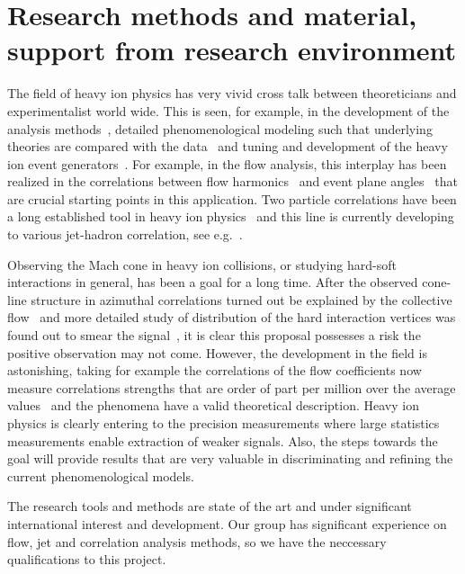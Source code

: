 \section{Research methods and material, support from research environment} %
\label{sec:researchmethods}

The field of heavy ion physics has very vivid cross talk between theoreticians and experimentalist world wide. This is seen, for example, in the development of the analysis methods~\cite{Poskanzer:1998yz,Bilandzic:2010jr}, detailed phenomenological modeling such that underlying theories are compared with the data~\cite{Burke:2013yra,Renk:2011gj,Niemi:2015qia} and tuning and development of the heavy ion event generators~\cite{Gyulassy:1994ew,Lin:2004en,Lokhtin2006}. For example, in the flow analysis, this interplay has been realized in the correlations between flow harmonics~\cite{Poskanzer:1998yz,ALICE:2011ab} and event plane angles~\cite{Aad:2014fla,Bhalerao:2014xra} that are crucial starting points in this application. Two particle correlations have been a long established tool in heavy ion physics~\cite{PhysRevLett.95.152301,PhysRevLett.97.052301} and this line is currently developing to various jet-hadron correlation, see e.g.~\cite{Khachatryan:2016tfj}. 

Observing the Mach cone in heavy ion collisions, or studying hard-soft interactions in general, has been a goal for a long time. After the observed cone-line structure in azimuthal correlations turned out be explained by the collective flow~\cite{ALICE:2011ab} and more detailed study of distribution of the hard interaction vertices was found out to smear the signal~\cite{Tachibana:2015qxa}, it is clear this proposal possesses a risk the positive observation may not come. However, the development in the field is astonishing, taking for example the correlations of the flow coefficients now measure correlations strengths that are order of part per million over the average values~\cite{ALICE:2016kpq} and the phenomena have a valid theoretical description. Heavy ion physics is clearly entering to the precision measurements where large statistics measurements enable extraction of weaker signals. Also, the steps towards the goal will provide results that are very valuable in discriminating and refining the current phenomenological models.

The research tools and methods are state of the art and under significant international interest and development. Our group has significant experience on flow, jet and correlation analysis methods, so we have the neccessary qualifications to this project.

